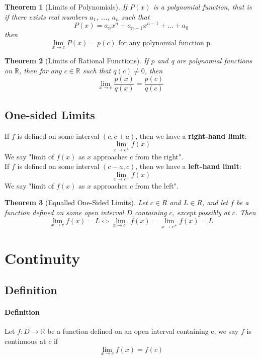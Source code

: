 \documentclass[12pt]{article}
\newtheorem{theorem}{Theorem}
\begin{document}
\begin{theorem}[Limits of Polynomials] 
    If $P(x)$ is a polynomial function, that is if there exists real numbers $a_1$, ..., $a_n$ 
    such that 
    \[
        P(x) = a_{n}x^{n} + a_{n - 1}x^{n - 1} + ... + a_{0}
    \]
    then
    \[
        \lim_{x \to c} P(x) = p(c) \textrm{ for any polynomial function p}.
    \]
\end{theorem}
\begin{theorem}[Limits of Rational Functions]
    \label{rational}
    If $p$ and q are polynomial functions on $\mathbb{R}$, then for any $c \in \mathbb{R}$
    such that $q(c) \neq 0$, then
    \[
        \lim_{x \to c} \frac{p(x)}{q(x)} = \frac{p(c)}{q(c)}\, 
    \]
\end{theorem}
\subsection{One-sided Limits}
If $f$ is defined on some interval $(c, c + a)$, then we have a \textbf{right-hand limit}:
\[
    \lim_{x \to c^+} f(x) 
\]
We say "limit of $f(x)$ as $x$ approaches $c$ from the right". \\
If $f$ is defined on some interval $(c - a, c)$, then we have a \textbf{left-hand limit}:
\[
    \lim_{x \to c^-} f(x) 
\]
We say "limit of $f(x)$ as $x$ approaches $c$ from the left".

\begin{theorem}[Equalled One-Sided Limits]
    Let $c \in R$ and $L \in R$, and let $f$ be a function defined on some
    open interval $D$ containing $c$, except possibly at $c$. Then
    \[
        \lim_{x \to c} f(x) = L \Leftrightarrow \lim_{x \to c^ -} f(x) = \lim_{x \to c^+} f(x) = L
    \]
\end{theorem}
\section{Continuity}
\subsection{Definition}
\paragraph{Definition} Let $f : D \rightarrow \mathbb{R}$ be a function defined on
an open interval containing c, we say $f$ is continuous at $c$ if 
\[
    \lim_{x \to c} f(x) = f(c)
\]
\end{document}
